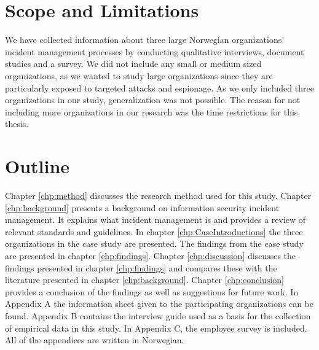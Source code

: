 \section{Scope and Limitations}
We have collected information about three large Norwegian organizations' incident management processes by conducting qualitative interviews, document studies and a survey. We did not include any small or medium sized organizations, as we wanted to study large organizations since they are particularly exposed to targeted attacks and espionage. As we only included three organizations in our study, generalization was not possible. The reason for not including more organizations in our research was the time restrictions for this thesis.

\section{Outline}
Chapter \ref{chp:method} discusses the research method used for this study.
Chapter \ref{chp:background} presents a background on information security incident management. It explains what incident management is and provides a review of relevant standards and guidelines. In chapter \ref{chp:CaseIntroductions} the three organizations in the case study are presented. The findings from the case study are presented in chapter \ref{chp:findings}. Chapter \ref{chp:discussion} discusses the findings presented in chapter \ref{chp:findings} and compares these with the literature presented in chapter \ref{chp:background}. Chapter \ref{chp:conclusion} provides a conclusion of the findings as well as suggestions for future work. In Appendix A the information sheet given to the participating organizations can be found. Appendix B contains the interview guide used as a basis for the collection of empirical data in this study. In Appendix C, the employee survey is included. All of the appendices are written in Norwegian.
